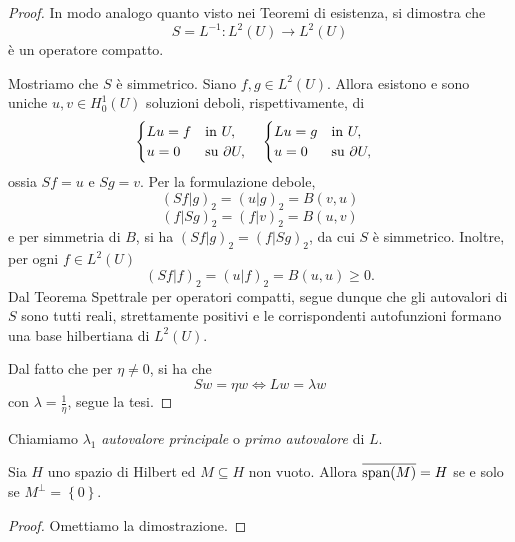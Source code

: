 \begin{proof}
	In modo analogo quanto visto nei Teoremi di esistenza, si dimostra che
	\[ S = L^{-1} : L^2(U) \to L^2(U)\]
	è un operatore compatto.
	
	Mostriamo che $S$ è simmetrico. Siano $f,g \in L^2(U)$. Allora esistono e sono uniche $u,v \in H^1_0(U)$ soluzioni deboli, rispettivamente, di 
	\begin{align*}
		&\begin{cases}
			Lu = f & \textup{in } U,\\
			u = 0 & \textup{su } \partial U,
		\end{cases} & &\begin{cases}
			Lu = g & \textup{in } U,\\
			u = 0 & \textup{su } \partial U,
		\end{cases} 
	\end{align*}
	ossia $Sf = u$ e $Sg = v$. Per la formulazione debole, 
	\[ (Sf|g)_2 = (u|g)_2 = B(v,u) \]
	\[ (f|Sg)_2 = (f|v)_2 = B(u,v) \]
	e per simmetria di $B$, si ha $(Sf|g)_2 =(f|Sg)_2$, da cui $S$ è simmetrico. Inoltre, per ogni $f \in L^2(U)$
	\[ (Sf|f)_2 = (u|f)_2 = B(u,u) \ge 0. \]
	Dal Teorema Spettrale per operatori compatti, segue dunque che gli autovalori di $S$ sono tutti reali, strettamente positivi e le corrispondenti autofunzioni formano una base hilbertiana di $L^2(U)$. 
	
	Dal fatto che per $\eta \ne 0$, si ha che 
	\[ Sw = \eta w \Longleftrightarrow Lw = \lambda w \]
	con $\lambda = \frac{1}{\eta}$, segue la tesi.
\end{proof}
\begin{definizione}
	Chiamiamo $\lambda_1$ \emph{autovalore principale} o \emph{primo autovalore} di $L$.
\end{definizione}

\begin{lemma}
	Sia $H$ uno spazio di Hilbert ed $M \subseteq H$ non vuoto. Allora $\overline{\textup{span}(M)} = H$ se e solo se $M^\perp = \left\lbrace 0\right\rbrace $.
\end{lemma}
\begin{proof}
	Omettiamo la dimostrazione.
\end{proof}

